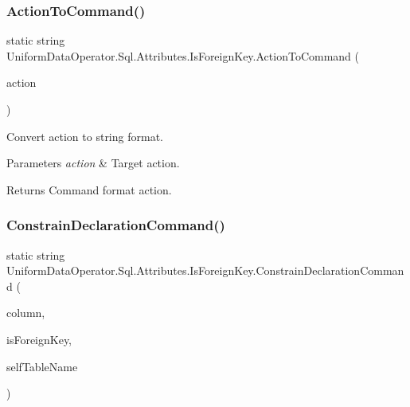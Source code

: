 \subsubsection{\texorpdfstring{Action\+To\+Command()}{ActionToCommand()}}
{\footnotesize\ttfamily static string Uniform\+Data\+Operator.\+Sql.\+Attributes.\+Is\+Foreign\+Key.\+Action\+To\+Command (\begin{DoxyParamCaption}\item[{\mbox{\hyperlink{class_uniform_data_operator_1_1_sql_1_1_attributes_1_1_is_foreign_key_a6039622384e2bbd1aa386e326ee0f850}{Action}}}]{action }\end{DoxyParamCaption})\hspace{0.3cm}{\ttfamily [static]}}



Convert action to string format. 


\begin{DoxyParams}{Parameters}
{\em action} & Target action.\\
\hline
\end{DoxyParams}
\begin{DoxyReturn}{Returns}
Command format action.
\end{DoxyReturn}
\mbox{\label{class_uniform_data_operator_1_1_sql_1_1_attributes_1_1_is_foreign_key_a795f460cb328bfe6d471134b4d48bedf}} 
\subsubsection{\texorpdfstring{Constrain\+Declaration\+Command()}{ConstrainDeclarationCommand()}\hspace{0.1cm}{\footnotesize\ttfamily [1/2]}}
{\footnotesize\ttfamily static string Uniform\+Data\+Operator.\+Sql.\+Attributes.\+Is\+Foreign\+Key.\+Constrain\+Declaration\+Command (\begin{DoxyParamCaption}\item[{\mbox{\hyperlink{class_uniform_data_operator_1_1_sql_1_1_attributes_1_1_column}{Column}}}]{column,  }\item[{\mbox{\hyperlink{class_uniform_data_operator_1_1_sql_1_1_attributes_1_1_is_foreign_key}{Is\+Foreign\+Key}}}]{is\+Foreign\+Key,  }\item[{string}]{self\+Table\+Name }\end{DoxyParamCaption})\hspace{0.3cm}{\ttfamily [static]}}



